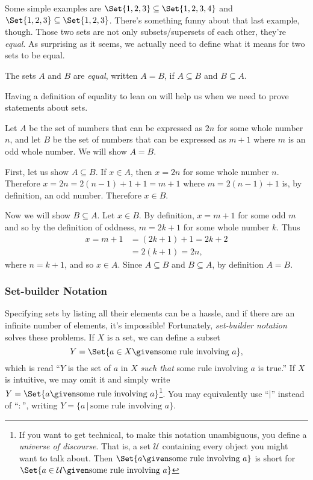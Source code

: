 	Some simple examples are $\Set{1,2,3}\subseteq \Set{1,2,3,4}$ and $\Set{1,2,3}\subseteq\Set{1,2,3}$.
	There's something funny about that last example, though.  Those two sets are not only subsets/supersets
	of each other, they're \emph{equal}.  As surprising as it seems, we actually need to define
	what it means for two sets to be equal.
	\begin{definition}
		The sets $A$ and $B$ are \emph{equal}, written $A=B$, if $A\subseteq B$ and $B\subseteq A$.
	\end{definition}
	Having a definition of equality to lean on will help us when we need to prove statements about sets.

	\begin{example}
		Let $A$ be the set of numbers that can be expressed
		as $2n$ for some whole number $n$, and let $B$ be the
		set of numbers that can be expressed as $m+1$ where $m$ is
		an odd whole number.  We will show $A=B$.

		First, let us show $A\subseteq B$.  If $x\in A$, then $x=2n$
		for some whole number $n$.  Therefore $x=2n=2(n-1)+1+1=m+1$ where
		$m=2(n-1)+1$ is, by definition, an odd number.  Therefore $x\in B$.

		Now we will show $B\subseteq A$.  Let $x\in B$.  By definition,
		$x=m+1$ for some odd $m$ and so by the definition of oddness, $m=2k+1$
		for some whole number $k$.  Thus 
		\begin{align*}
			x=m+1&=(2k+1)+1=2k+2\\
			&=2(k+1)=2n,
		\end{align*} where $n=k+1$, and so $x\in A$.  Since $A\subseteq B$
		and $B\subseteq A$, by definition $A=B$.
	\end{example}
	

	\subsubsection{Set-builder Notation}
	Specifying sets by listing all their elements can be a hassle, and if there are an infinite
	number of elements, it's impossible!  Fortunately, \emph{set-builder notation}
	solves these problems.
	If $X$ is a set, we can define a subset 
	\[
		Y= \Set{a\in X\given\text{some rule involving }a},
	\]
	which is read ``$Y$ is the set of $a$ in $X$ \emph{such that} some rule
	involving $a$ is true.''  If $X$ is intuitive, we may omit it and
	simply write $Y=\Set{a\given\text{some rule involving }a}$\footnote{ If you want
	to get technical, to make this notation unambiguous, you define a 
	\emph{universe of discourse}. That is, a set $\mathcal U$ containing
	every object you might want to talk about. Then $\Set{a\given\text{some rule involving }a}$
	is short for $\Set{a\in\mathcal U\given\text{some rule involving }a}$}.  You may equivalently
	use ``$|$'' instead of ``$:$'', writing $Y=\{a\,|\,\text{some rule involving }a\}$.


